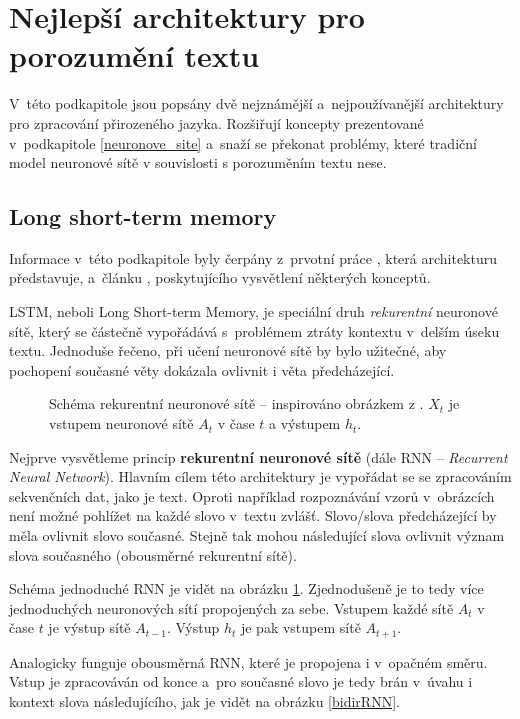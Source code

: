 \section{Nejlepší architektury pro porozumění textu}
V~této podkapitole jsou popsány dvě nejznámější a~nejpoužívanější architektury pro zpracování přirozeného jazyka. Rozšiřují koncepty prezentované v~podkapitole \ref{neuronove_site} a~snaží se překonat problémy, které tradiční model neuronové sítě v souvislosti s porozuměním textu nese.\par

\subsection{Long short-term memory}
\label{lstm}
Informace v~této podkapitole byly čerpány z~prvotní práce \cite{LSTM}, která architekturu představuje,  a~článku \cite{understandingLSTM}, poskytujícího vysvětlení některých konceptů.\par
LSTM, neboli Long Short-term Memory, je speciální druh \emph{rekurentní} neuronové sítě, který se částečně vypořádává s~problémem ztráty kontextu v~delším úseku textu. Jednoduše řečeno, při učení neuronové sítě by bylo užitečné, aby pochopení současné věty dokázala ovlivnit i věta předcházející.\par

\begin{figure}[hbt]
    \centering
	\caption{Schéma rekurentní neuronové sítě -- inspirováno obrázkem z \cite{understandingLSTM}. $X_t$ je vstupem neuronové sítě $A_t$ v čase $t$ a výstupem $h_t$.}
	\label{RNN}
\end{figure}

Nejprve vysvětleme princip \textbf{rekurentní neuronové sítě} (dále RNN -- \textit{Recurrent Neural Network}).
Hlavním cílem této architektury je vypořádat se se zpracováním sekvenčních dat, jako je text. Oproti například rozpoznávání vzorů v~obrázcích není možné pohlížet na každé slovo v~textu zvlášť. Slovo/slova předcházející by měla ovlivnit slovo současné. Stejně tak mohou následující slova ovlivnit význam slova současného (obousměrné rekurentní sítě).\par
Schéma jednoduché RNN je vidět na obrázku \ref{RNN}. Zjednodušeně je to tedy více jednoduchých neuronových sítí propojených za sebe. Vstupem každé sítě $A_t$ v čase $t$ je výstup sítě $A_{t-1}$. Výstup $h_t$ je pak vstupem sítě $A_{t+1}$.\par
Analogicky funguje obousměrná RNN, které je propojena i v~opačném směru. Vstup je zpracováván od konce a~pro současné slovo je tedy brán v~úvahu i kontext slova následujícího, jak je vidět na obrázku \ref{bidirRNN}.\par

